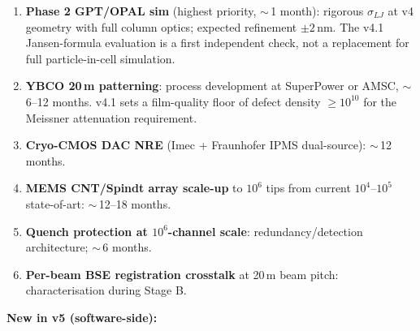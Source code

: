 \documentclass[11pt,letterpaper]{article}
\begin{document}
\begin{enumerate}[leftmargin=1.6em]
  \item \textbf{Phase 2 GPT/OPAL sim} (highest priority, $\sim$\,1 month): rigorous $\sigma_{LJ}$ at v4 geometry with full column optics; expected refinement $\pm 2$\,nm. The v4.1 Jansen-formula evaluation is a first independent check, not a replacement for full particle-in-cell simulation.
  \item \textbf{YBCO 20\,\textmu m patterning}: process development at SuperPower or AMSC, $\sim$\,6--12 months. v4.1 sets a film-quality floor of defect density $\geq 10^{10}$ for the Meissner attenuation requirement.
  \item \textbf{Cryo-CMOS DAC NRE} (Imec + Fraunhofer IPMS dual-source): $\sim$\,12 months.
  \item \textbf{MEMS CNT/Spindt array scale-up} to $10^6$ tips from current $10^4$--$10^5$ state-of-art: $\sim$\,12--18 months.
  \item \textbf{Quench protection at $10^6$-channel scale}: redundancy/detection architecture; $\sim$\,6 months.
  \item \textbf{Per-beam BSE registration crosstalk} at 20\,\textmu m beam pitch: characterisation during Stage B.
\end{enumerate}

\textbf{New in v5 (software-side):}
\end{document}
